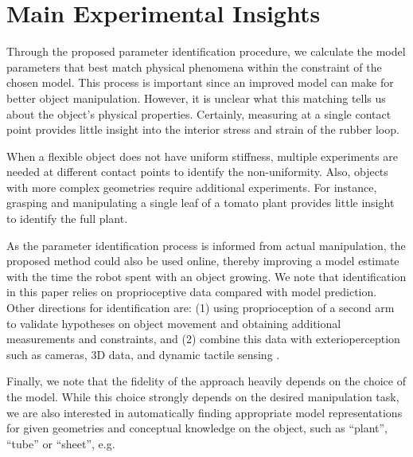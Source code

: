 \documentclass[runningheads,a4paper]{llncs}
\begin{document}
\section{Main Experimental Insights}
Through the proposed parameter identification procedure, we calculate the model parameters that best match physical phenomena within the constraint of the chosen model.  This process is important since an improved model can make for better object manipulation.  However, it is unclear what this matching tells us about the object's physical properties.  Certainly, measuring at a single contact point provides little insight into the interior stress and strain of the rubber loop.

When a flexible object does not have uniform stiffness, multiple experiments are needed at different contact points to identify the non-uniformity.  Also, objects with more complex geometries require additional experiments.  For instance, grasping and manipulating a single leaf of a tomato plant provides little insight to identify the full plant.

As the parameter identification process is informed from actual manipulation, the proposed method could also be used online, thereby improving a model estimate with the time the robot spent with an object growing. We note that identification in this paper relies on proprioceptive data compared with model prediction. Other directions for identification are: (1) using proprioception of a second arm to validate hypotheses on object movement and obtaining additional measurements and constraints, and (2) combine this data with exterioperception such as cameras, 3D data, and dynamic tactile sensing \cite{hughes2014}. 

Finally, we note that the fidelity of the approach heavily depends on the choice of the model. While this choice strongly depends on the desired manipulation task, we are also interested in automatically finding appropriate model representations for given geometries and conceptual knowledge on the object, such as ``plant'', ``tube'' or ``sheet'', e.g.  




\end{document}
